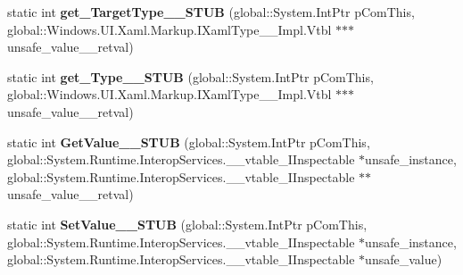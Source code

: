 \begin{DoxyCompactItemize}
\item 
\mbox{\label{struct_windows_1_1_u_i_1_1_xaml_1_1_markup_1_1_i_xaml_member_____impl_1_1_vtbl_a5ca08627ab112151af93f8045a7e4d7f}} 
static int {\bfseries get\+\_\+\+Target\+Type\+\_\+\+\_\+\+S\+T\+UB} (global\+::\+System.\+Int\+Ptr p\+Com\+This, global\+::\+Windows.\+U\+I.\+Xaml.\+Markup.\+I\+Xaml\+Type\+\_\+\+\_\+\+Impl.\+Vtbl $\ast$$\ast$$\ast$unsafe\+\_\+value\+\_\+\+\_\+retval)
\item 
\mbox{\label{struct_windows_1_1_u_i_1_1_xaml_1_1_markup_1_1_i_xaml_member_____impl_1_1_vtbl_a1fe6ad1a5825b6a9bc1e12661eb240ac}} 
static int {\bfseries get\+\_\+\+Type\+\_\+\+\_\+\+S\+T\+UB} (global\+::\+System.\+Int\+Ptr p\+Com\+This, global\+::\+Windows.\+U\+I.\+Xaml.\+Markup.\+I\+Xaml\+Type\+\_\+\+\_\+\+Impl.\+Vtbl $\ast$$\ast$$\ast$unsafe\+\_\+value\+\_\+\+\_\+retval)
\item 
\mbox{\label{struct_windows_1_1_u_i_1_1_xaml_1_1_markup_1_1_i_xaml_member_____impl_1_1_vtbl_a701180ec993bf799ab85b05b4ac244e6}} 
static int {\bfseries Get\+Value\+\_\+\+\_\+\+S\+T\+UB} (global\+::\+System.\+Int\+Ptr p\+Com\+This, global\+::\+System.\+Runtime.\+Interop\+Services.\+\_\+\+\_\+vtable\+\_\+\+I\+Inspectable $\ast$unsafe\+\_\+instance, global\+::\+System.\+Runtime.\+Interop\+Services.\+\_\+\+\_\+vtable\+\_\+\+I\+Inspectable $\ast$$\ast$unsafe\+\_\+value\+\_\+\+\_\+retval)
\item 
\mbox{\label{struct_windows_1_1_u_i_1_1_xaml_1_1_markup_1_1_i_xaml_member_____impl_1_1_vtbl_ae54da9e1a9116b5083fcb8bf8405818f}} 
static int {\bfseries Set\+Value\+\_\+\+\_\+\+S\+T\+UB} (global\+::\+System.\+Int\+Ptr p\+Com\+This, global\+::\+System.\+Runtime.\+Interop\+Services.\+\_\+\+\_\+vtable\+\_\+\+I\+Inspectable $\ast$unsafe\+\_\+instance, global\+::\+System.\+Runtime.\+Interop\+Services.\+\_\+\+\_\+vtable\+\_\+\+I\+Inspectable $\ast$unsafe\+\_\+value)
\item 
\mbox{\label{struct_windows_1_1_u_i_1_1_xaml_1_1_markup_1_1_i_xaml_member_____impl_1_1_vtbl_a1e4acc27c4a3f05a886512f1dc1c417d}} 
$$
\end{DoxyCompactItemize}
